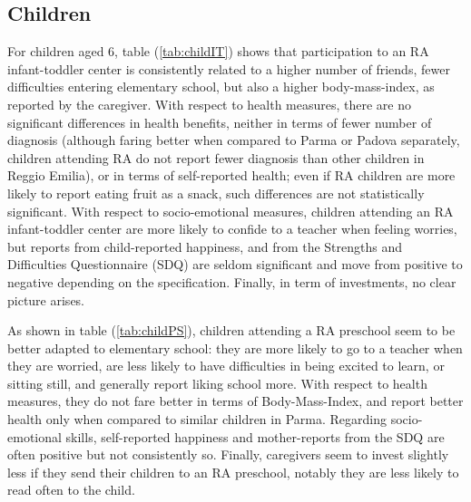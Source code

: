 \documentclass[12pt]{article}
\begin{document}
\subsection{Children}
For children aged 6, table (\ref{tab:childIT}) shows that participation to an RA infant-toddler center is consistently related to a higher number of friends, fewer difficulties entering elementary school, but also a higher body-mass-index, as reported by the caregiver. 
With respect to health measures, there are no significant differences in health benefits, neither in terms of fewer number of diagnosis (although faring better when compared to Parma or Padova separately, children attending RA do not report fewer diagnosis than other children in Reggio Emilia), or in terms of self-reported health; even if RA children are more likely to report eating fruit as a snack, such differences are not statistically significant.
With respect to socio-emotional measures, children attending an RA infant-toddler center are more likely to confide to a teacher when feeling worries, but reports from child-reported happiness, and from the Strengths and Difficulties Questionnaire (SDQ) are seldom significant and move from positive to negative depending on the specification.
Finally, in term of investments, no clear picture arises.

As shown in table (\ref{tab:childPS}), children attending a RA preschool seem to be better adapted to elementary school: they are more likely to go to a teacher when they are worried, are less likely to have difficulties in being excited to learn, or sitting still, and generally report liking school more.
With respect to health measures, they do not fare better in terms of Body-Mass-Index, and report better health only when compared to similar children in Parma. 
Regarding socio-emotional skills, self-reported happiness and mother-reports from the SDQ are often positive but not consistently so.
Finally, caregivers seem to invest slightly less if they send their children to an RA preschool, notably they are less likely to read often to the child.
\end{document}
